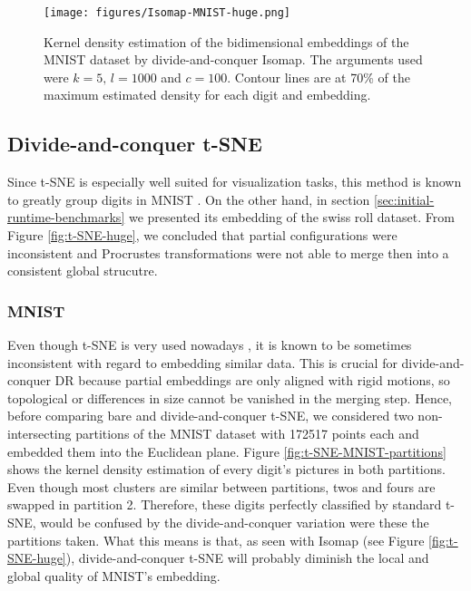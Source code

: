 \begin{figure}
    \centering
    \texttt{[image: figures/Isomap-MNIST-huge.png]}
    \caption{Kernel density estimation of the bidimensional embeddings of the MNIST dataset \citep{Cohen2017} by divide-and-conquer Isomap. The arguments used were $k=5, \, l=1000$ and $c=100$. Contour lines are at 70\% of the maximum estimated density for each digit and embedding.}
    \label{fig:Isomap-MNIST-huge}
\end{figure}

\subsection{Divide-and-conquer t-SNE}

Since t-SNE is especially well suited for visualization tasks, this method is known to greatly group digits in MNIST \citep{Vandermaaten2008}. On the other hand, in section \ref{sec:initial-runtime-benchmarks} we presented its embedding of the swiss roll dataset. From Figure \ref{fig:t-SNE-huge}, we concluded that partial configurations were inconsistent and Procrustes transformations were not able to merge then into a consistent global strucutre.

\subsubsection{MNIST}

Even though t-SNE is very used nowadays \citep{Wattenberg2016}, it is known to be sometimes inconsistent with regard to embedding similar data. This is crucial for divide-and-conquer DR because partial embeddings are only aligned with rigid motions, so topological or differences in size cannot be vanished in the merging step. Hence, before comparing bare and divide-and-conquer t-SNE, we considered two non-intersecting partitions of the MNIST dataset with 172517 points each and embedded them into the Euclidean plane. Figure \ref{fig:t-SNE-MNIST-partitions} shows the kernel density estimation of every digit's pictures in both partitions. Even though most clusters are similar between partitions, twos and fours are swapped in partition 2. Therefore, these digits perfectly classified by standard t-SNE, would be confused by the divide-and-conquer variation were these the partitions taken. What this means is that, as seen with Isomap (see Figure \ref{fig:t-SNE-huge}), divide-and-conquer t-SNE will probably diminish the local and global quality of MNIST's embedding.


